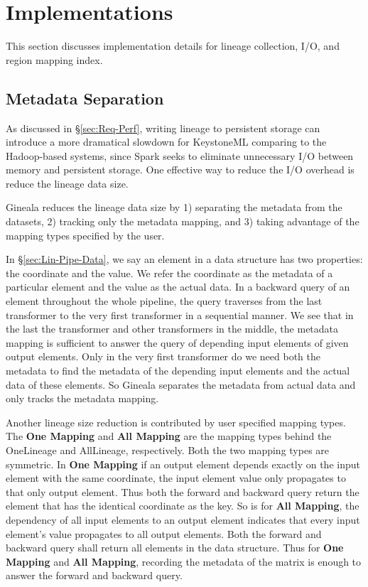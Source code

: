 \documentclass{sig-alternate}
\begin{document}
\section{Implementations}
\label{sec:Impl}
This section discusses implementation details for lineage collection, I/O, and region mapping index.

\subsection{Metadata Separation}
As discussed in \S\ref{sec:Req-Perf}, writing lineage to persistent storage can introduce a more dramatical slowdown for KeystoneML comparing
to the Hadoop-based systems, since Spark seeks to eliminate unnecessary I/O between memory and persistent storage.
One effective way to reduce the I/O overhead is reduce the lineage data size.

Gineala reduces the lineage data size by 1) separating the metadata from the datasets, 2) tracking only the metadata mapping, 
and 3) taking advantage of the mapping types specified by the user.

In \S\ref{sec:Lin-Pipe-Data}, we say an element in a data structure has two properties: the coordinate and the value.
We refer the coordinate as the metadata of a particular element and the value as the actual data. 
In a backward query of an element throughout the whole pipeline, the query traverses from the last transformer
to the very first transformer in a sequential manner. 
We see that in the last the transformer and other transformers in the middle, the metadata mapping is sufficient to answer
the query of depending input elements of given output elements. Only in the very first transformer do we need both the metadata
to find the metadata of the depending input elements and the actual data of these elements.
So Gineala separates the metadata from actual data and only tracks the metadata mapping.

Another lineage size reduction is contributed by user specified mapping types. 
The {\bf One Mapping} and {\bf All Mapping} are the mapping types behind the OneLineage and AllLineage, respectively.
Both the two mapping types are symmetric.
In {\bf One Mapping} if an output element depends exactly on the input element with the same coordinate, 
the input element value only propagates to that only output element. 
Thus both the forward and backward query return the element that has the identical coordinate as the key.
So is for {\bf All Mapping}, the dependency of all input elements to an output element indicates that every input element's value propagates to all output elements.
Both the forward and backward query shall return all elements in the data structure.
Thus for {\bf One Mapping} and {\bf All Mapping}, recording the metadata of the matrix is enough to answer the forward and backward query.
\end{document}
